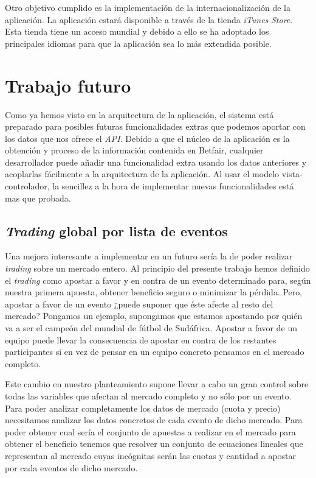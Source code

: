  Otro objetivo cumplido es la implementación de la internacionalización de la aplicación. La aplicación estará disponible a través de la tienda \emph{iTunes} \emph{Store}. Esta tienda tiene un acceso mundial y debido a ello se ha adoptado los principales idiomas para que la aplicación sea lo más extendida posible. 
 
\section{Trabajo futuro}
 Como ya hemos visto en la arquitectura de la aplicación, el sistema está preparado para posibles futuras funcionalidades extras que podemos aportar con los datos que nos ofrece el \emph{API}. Debido a que el núcleo de la aplicación es la obtención y proceso de la información contenida en Betfair, cualquier desarrollador puede añadir una funcionalidad extra usando los datos anteriores y acoplarlas fácilmente a la arquitectura de la aplicación. Al usar el modelo vista-controlador, la sencillez a la hora de implementar nuevas funcionalidades está mas que probada.
 
\subsection*{\emph{Trading} global por lista de eventos}
 Una mejora interesante a implementar en un futuro sería la de poder realizar \emph{trading} sobre un mercado entero. Al principio del presente trabajo hemos definido el \emph{trading} como apostar a favor y en contra de un evento determinado para, según nuestra primera apuesta, obtener beneficio seguro o minimizar la pérdida. Pero, apostar a favor de un evento ¿puede suponer que éste afecte al resto del mercado? Pongamos un ejemplo, supongamos que estamos apostando por quién va a ser el campeón del mundial de fútbol de Sudáfrica. Apostar a favor de un equipo puede llevar la consecuencia de apostar en contra de los restantes participantes si en vez de pensar en un equipo concreto pensamos en el mercado completo. 
 
  Este cambio en nuestro planteamiento supone llevar a cabo un gran control sobre todas las variables que afectan al mercado completo y no sólo por un evento. Para poder analizar completamente los datos de mercado (cuota y precio) necesitamos analizar los datos concretos de cada evento de dicho mercado. Para poder obtener cual sería el conjunto de apuestas a realizar en el mercado para obtener el beneficio tenemos que resolver un conjunto de ecuaciones lineales que representan al mercado cuyas incógnitas serán las cuotas y cantidad a apostar por cada eventos de dicho mercado.    
  
